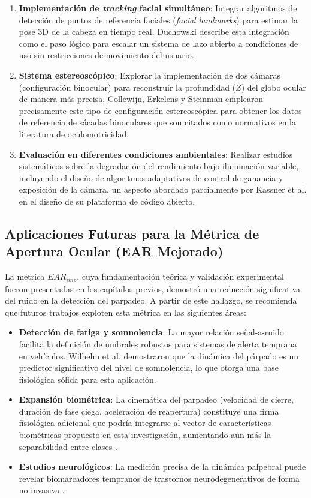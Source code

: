 \begin{enumerate}
	\item \textbf{Implementación de \textit{tracking} facial simultáneo}: Integrar algoritmos de detección de puntos de referencia faciales (\textit{facial landmarks}) para estimar la pose 3D de la cabeza en tiempo real.
	Duchowski \cite{duchowski2017} describe esta integración como el paso lógico para escalar un sistema de lazo abierto a condiciones de uso sin restricciones de movimiento del usuario.
	\item \textbf{Sistema estereoscópico}: Explorar la implementación de dos cámaras (configuración binocular) para reconstruir la profundidad ($Z$) del globo ocular de manera más precisa.
	Collewijn, Erkelens y Steinman \cite{collewijn1988binocular} emplearon precisamente este tipo de configuración estereoscópica para obtener los datos de referencia de sácadas binoculares que son citados como normativos en la literatura de oculomotricidad.
	\item \textbf{Evaluación en diferentes condiciones ambientales}: Realizar estudios sistemáticos sobre la degradación del rendimiento bajo iluminación variable, incluyendo el diseño de algoritmos adaptativos de control de ganancia y exposición de la cámara, un aspecto abordado parcialmente por Kassner et al.
	\cite{kassner2014pupil} en el diseño de su plataforma de código abierto.
\end{enumerate}

\subsection{Aplicaciones Futuras para la Métrica de Apertura Ocular (EAR Mejorado)}

La métrica $EAR_{imp}$, cuya fundamentación teórica y validación experimental fueron presentadas en los capítulos previos, demostró una reducción significativa del ruido en la detección del parpadeo. A partir de este hallazgo, se recomienda que futuros trabajos exploten esta métrica en las siguientes áreas:

\begin{itemize}
	\item \textbf{Detección de fatiga y somnolencia}: La mayor relación señal-a-ruido facilita la definición de umbrales robustos para sistemas de alerta temprana en vehículos. Wilhelm et al. \cite{wilhelm2001pupil} demostraron que la dinámica del párpado es un predictor significativo del nivel de somnolencia, lo que otorga una base fisiológica sólida para esta aplicación.
	\item \textbf{Expansión biométrica}: La cinemática del parpadeo (velocidad de cierre, duración de fase ciega, aceleración de reapertura) constituye una firma fisiológica adicional que podría integrarse al vector de características biométricas propuesto en esta investigación, aumentando aún más la separabilidad entre clases \cite{jain2016biometric}.
	\item \textbf{Estudios neurológicos}: La medición precisa de la dinámica palpebral puede revelar biomarcadores tempranos de trastornos neurodegenerativos de forma no invasiva \cite{leigh2015neurology}.
\end{itemize}

